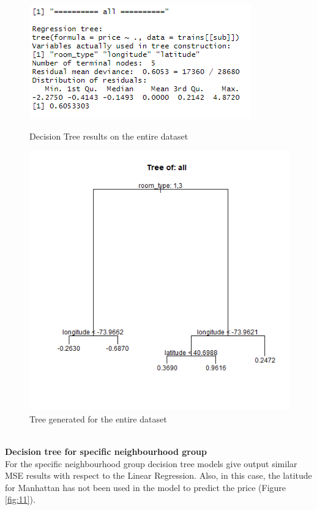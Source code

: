 \documentclass{FR16}
\begin{document}
\begin{figure}[!htb]
   \begin{minipage}{0.48\textwidth}
     \centering
     \includegraphics[width=.7\linewidth]{figures/dt.PNG} 
     \caption{Decision Tree results on the entire dataset}\label{fig:9}
   \end{minipage}\hfill
   \begin{minipage}{0.48\textwidth}
     \centering
     \includegraphics[width=.7\linewidth]{figures/tree-all.PNG}
     \caption{Tree generated for the entire dataset}\label{fig:10}
   \end{minipage}
\end{figure}


\noindent \\ \textbf{Decision tree for specific neighbourhood group}\\
\noindent For the specific neighbourhood group decision tree models give output similar MSE results with respect to the Linear Regression. Also, in this case, the latitude for Manhattan has not been used in the model to predict the price (Figure \ref{fig:11}). 
\end{document}
